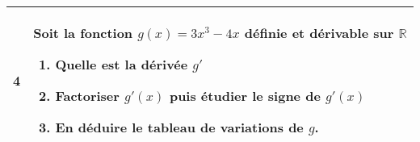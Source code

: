 \documentclass[10pt,a4paper]{article}
\def\R{{\mathbb R}}
\theoremstyle{break}
\begin{document}
\begin{tabular}{|p{2cm}|p{14cm}| }
	\\
		\hline
		
	
		4&Soit la fonction $g(x)=3x^3-4x$ définie et dérivable sur $\R$
		\begin{enumerate}
			\item Quelle est la dérivée $g'$\newline
			\item Factoriser $g'(x)$ puis étudier le signe de $g'(x)$\newline
			\item En déduire le tableau de variations de $g$.\newline \newline
		\end{enumerate}
	\\
		\hline
	
\end{tabular}
\end{document}
